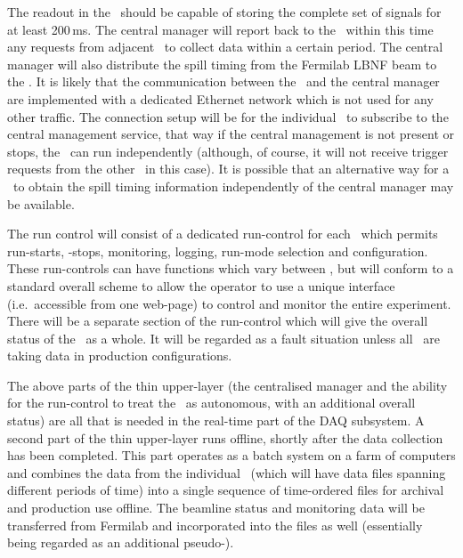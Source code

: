 The readout in the \COMPARTMENTS\ should be capable of storing the
complete set of signals for at least 200\,ms.  The central manager
will report back to the \COMPARTMENTS\ within this time any requests
from adjacent \COMPARTMENTS\ to collect data within a certain period.
The central manager will also distribute the spill timing from the
Fermilab LBNF beam to the \COMPARTMENTS.  It is likely that the
communication between the \COMPARTMENTS\ and the central manager are
implemented with a dedicated Ethernet network which is not used for any
other traffic.  The connection setup
will be for the individual \COMPARTMENT\ to subscribe to the central
management service, that way if the central management is not present
or stops, the \COMPARTMENT\ can run independently (although, of course,
it will not receive trigger requests from the other \COMPARTMENTS\ in
this case).  It is possible that an alternative way for a \COMPARTMENT\
to obtain the spill timing information independently of the central
manager may be available.

The run control will consist of a dedicated run-control for each
\COMPARTMENT\ which permits run-starts, -stops, monitoring, logging,
run-mode selection and configuration.  These run-controls can have
functions which vary between \COMPARTMENTS, but will conform to a
standard overall scheme to allow the operator to use a unique
interface (i.e.\ accessible from one web-page) to control and monitor
the entire experiment.  There will be a separate section of the
run-control which will give the overall status of the \COMPARTMENTS\ as
a whole.  It will be regarded as a fault situation unless all
\COMPARTMENTS\ are taking data in production configurations. 

The above parts of the thin upper-layer (the centralised manager and
the ability for the run-control to treat the \COMPARTMENTS\ as
autonomous, with an additional overall status) are all that is needed
in the real-time part of the DAQ subsystem.  A second part of the thin
upper-layer runs offline, shortly after the data collection has been
completed.  This part operates as a batch system on a farm of
computers and combines the data from the individual \COMPARTMENTS\
(which will have data files spanning different periods of time) into
a single sequence of time-ordered files for archival and production
use offline.  The beamline status and monitoring data will be
transferred from Fermilab and incorporated into the files as well
(essentially being regarded as an additional pseudo-\COMPARTMENT).
